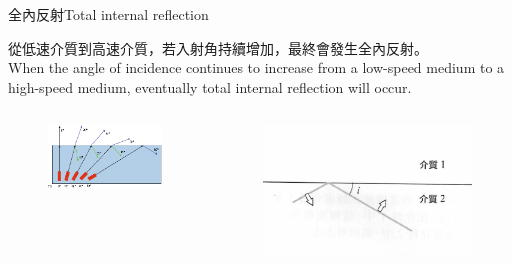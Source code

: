 \documentclass[beamer=true]{standalone}
\begin{document}
\begin{frame}{全內反射Total internal reflection}

    從低速介質到高速介質，若入射角持續增加，最終會發生全內反射。\\When the angle of incidence continues to increase from a low-speed medium to a high-speed medium, eventually total internal reflection will occur.
    \bigskip
    \begin{columns}
        \begin{figure}
            \centering
            \includegraphics[width=1\linewidth]{images/Screenshot 2023-09-27 at 8.56.48 PM.png}


        \end{figure}
        \begin{figure}
            \centering
            \includegraphics[width=1\linewidth]{images/Screenshot 2023-09-27 at 8.57.33 PM.png}


        \end{figure}
    \end{columns}
\end{frame}
\end{document}
